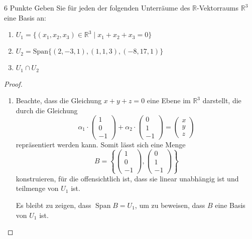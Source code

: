 \documentclass{../problemset}
\begin{document}
\begin{problem}{6 Punkte}
Geben Sie für jeden der folgenden Unterräume des $\mathbb{R}$-Vektorraums $\mathbb{R}^3$ eine Basis an:
\begin{enumerate}
	\item $U_1 = \{(x_1, x_2, x_3) \in \mathbb{R}^3 \mid x_1 + x_2 + x_3 = 0\}$
	\item $U_2 = \text{Span}\{(2, -3, 1), (1, 1, 3), (-8, 17, 1)\}$
	\item $U_1 \cap U_2$
\end{enumerate}
\begin{proof}
	$ $

	\begin{enumerate}
		\item Beachte, dass die Gleichung $x + y + z = 0$ eine Ebene im $\mathbb{R}^3$ darstellt, die durch die Gleichung
		      \[
			      \alpha_1 \cdot \begin{pmatrix}
				      1 \\
				      0 \\
				      -1
			      \end{pmatrix} + \alpha_2 \cdot \begin{pmatrix}
				      0 \\
				      1 \\
				      -1
			      \end{pmatrix} = \begin{pmatrix}
				      x \\
				      y \\
				      z
			      \end{pmatrix}
		      \]
		      repräsentiert werden kann. Somit lässt sich eine Menge
		      \[
			      B = \left\{\begin{pmatrix}
				      1 \\
				      0 \\
				      -1
			      \end{pmatrix}, \begin{pmatrix}
				      0 \\
				      1 \\
				      -1
			      \end{pmatrix}\right\}
		      \]
		      konstruieren, für die offensichtlich ist, dass sie linear unabhängig ist und teilmenge von $U_1$ ist.

		      Es bleibt zu zeigen, dass $\operatorname{Span} B = U_1$, um zu beweisen, dass $B$ eine Basis von $U_1$ ist.


\end{enumerate}
\end{proof}
\end{problem}
\end{document}

